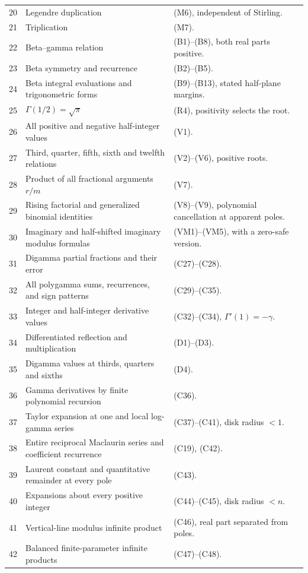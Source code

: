 \begin{longtable}{@{}r >{\raggedright\arraybackslash}p{}>{\raggedright\arraybackslash}p{}@{}}
20 & Legendre duplication & (M6), independent of Stirling.\\
21 & Triplication & (M7).\\
22 & Beta--gamma relation & (B1)--(B8), both real parts positive.\\
23 & Beta symmetry and recurrence & (B2)--(B5).\\
24 & Beta integral evaluations and trigonometric forms & (B9)--(B13), stated half-plane margins.\\
25 & $\Gamma(1/2)=\sqrt\pi$ & (R4), positivity selects the root.\\
26 & All positive and negative half-integer values & (V1).\\
27 & Third, quarter, fifth, sixth and twelfth relations & (V2)--(V6), positive roots.\\
28 & Product of all fractional arguments $r/m$ & (V7).\\
29 & Rising factorial and generalized binomial identities & (V8)--(V9), polynomial cancellation at apparent poles.\\
30 & Imaginary and half-shifted imaginary modulus formulas & (VM1)--(VM5), with a zero-safe version.\\
31 & Digamma partial fractions and their error & (C27)--(C28).\\
32 & All polygamma sums, recurrences, and sign patterns & (C29)--(C35).\\
33 & Integer and half-integer derivative values & (C32)--(C34), $\Gamma'(1)=-\gamma$.\\
34 & Differentiated reflection and multiplication & (D1)--(D3).\\
35 & Digamma values at thirds, quarters and sixths & (D4).\\
36 & Gamma derivatives by finite polynomial recursion & (C36).\\
37 & Taylor expansion at one and local log-gamma series & (C37)--(C41), disk radius $<1$.\\
38 & Entire reciprocal Maclaurin series and coefficient recurrence & (C19), (C42).\\
39 & Laurent constant and quantitative remainder at every pole & (C43).\\
40 & Expansions about every positive integer & (C44)--(C45), disk radius $<n$.\\
41 & Vertical-line modulus infinite product & (C46), real part separated from poles.\\
42 & Balanced finite-parameter infinite products & (C47)--(C48).\\

\end{longtable}
